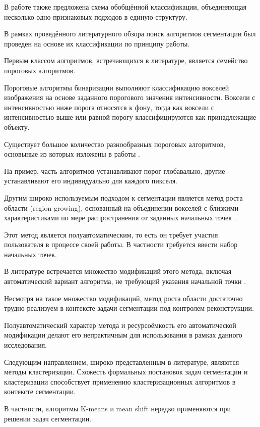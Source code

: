 В работе \cite{ханыков2018классификация} также предложена схема обобщённой классификации, объединяющая несколько одно-признаковых подходов в единую структуру.

В рамках проведённого литературного обзора поиск алгоритмов сегментации был проведен на основе их классификации по принципу работы.

Первым классом алгоритмов, встречающихся в литературе, является семейство пороговых алгоритмов. 

Пороговые алгоритмы бинаризации выполняют классификацию вокселей изображения на основе заданного порогового значения интенсивности. Воксели с интенсивностью ниже порога относятся к фону, тогда как воксели с интенсивностью выше или равной порогу классифицируются как принадлежащие объекту.

Существует большое количество разнообразных пороговых алгоритмов, основыные из которых изложены в работы \cite{wirjadi2007survey}. 

На пример, часть алгоритмов устанавливают порог глобавально, другие - устанавливают его индивидуально для каждого пикселя. 

Другим широко используемым подходом к сегментации является метод роста области (region growing), основанный на объединении вокселей с близкими характеристиками по мере распространения от заданных начальных точек \cite{adams1994seeded}.

Этот метод является полуавтоматическим, то есть он требует участия пользователя в процессе своей работы. В частности требуется ввести набор начальных точек.

В литературе встречается множество модификаций этого метода, включая автоматический вариант алгоритма, не требующий указания начальной точки \cite{lin2000unseeded}. 

Несмотря на такое множество модификаций, метод роста области достаточно трудно реализуем в контексте задачи сегментации под контролем реконструкции.

Полуавтоматический характер метода и ресурсоёмкость его автоматической модификации делают его непрактичным для использования в рамках данного исследования.

Следующим направлением, широко представленным в литературе, являются методы кластеризации. Схожесть формальных постановок задач сегментации и кластеризации способствует применению кластеризационных алгоритмов в контексте сегментации.

В частности, алгоритмы K-means \cite{sarker2017segmentation} и mean shift \cite{comaniciu2002mean} нередко применяются при решении задач сегментации.

